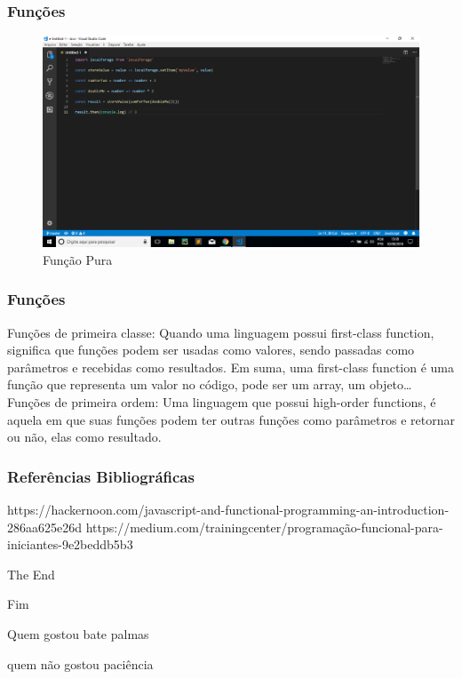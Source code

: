 \documentclass{beamer}
\begin{document}
\begin{frame}
\frametitle{Funções}
\begin{figure}
    \centering
    \includegraphics[width=.9\columnwidth]{Imagens/Imagem3.png}
    \caption{Função Pura}
    \label{fig:my_label}
\end{figure}

\end{frame}


\begin{frame}
\frametitle{Funções}
Funções de primeira classe: Quando uma linguagem possui first-class function, significa que funções podem ser usadas como valores, sendo passadas como parâmetros e recebidas como resultados. Em suma, uma first-class function é uma função que representa um valor no código, pode ser um array, um objeto…
\newline 
\newline Funções de primeira ordem: 
Uma linguagem que possui high-order functions, é aquela em que suas funções podem ter outras funções como parâmetros e retornar ou não, elas como resultado.
\end{frame}




\begin{frame}
\frametitle{Referências Bibliográficas}
\footnotesize{
\begin{thebibliography}{99} %
\newblock https://hackernoon.com/javascript-and-functional-programming-an-introduction-286aa625e26d
\newblock https://medium.com/trainingcenter/programação-funcional-para-iniciantes-9e2beddb5b3

\end{thebibliography}



}
\end{frame}


\begin{frame}
\Huge{\centerline{The End}}
\Huge{\centerline{Fim}}
\Huge{\centerline{Quem gostou bate palmas}}
\Huge{\centerline{quem não gostou paciência}}
\end{frame}

\end{document}
